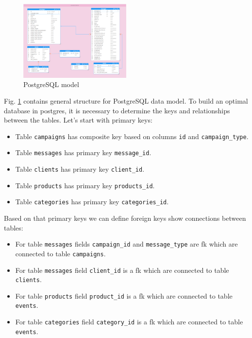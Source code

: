 \documentclass[conference]{IEEEtran}
\newcommand{\code}[1]{\colorbox{codegray}{\texttt{#1}}}
\begin{document}
\begin{figure}
  \centering
    \includegraphics[width=0.5\textwidth]{./pictures/postgres.png}
    \caption[PostgreSQL model]{PostgreSQL model}\label{fig:postgres}
\end{figure}

 Fig. \ref{fig:postgres} contains general structure for PostgreSQL data model. To build an optimal database in postgres, it is necessary to determine the keys and relationships between the tables. Let's start with primary keys:
 \begin{itemize}
     \item Table \code{campaigns} has composite key based on columns \code{id} and \code{campaign\_type}.
     \item Table \code{messages} has primary key \code{message\_id}.
     \item Table \code{clients} has primary key \code{client\_id}.
     \item Table \code{products} has primary key \code{products\_id}.
     \item Table \code{categories} has primary key \code{categories\_id}.
 \end{itemize}

Based on that primary keys we can define foreign keys show connections between tables:
\begin{itemize}
    \item For table \code{messages} fields \code{campaign\_id} and \code{message\_type} are fk which are connected to table \code{campaigns}.
    \item For table \code{messages} field \code{client\_id} is a fk which are connected to table \code{clients}.
    \item For table \code{products} field \code{product\_id} is a fk which are connected to table \code{events}.
    \item For table \code{categories} field \code{category\_id} is a fk which are connected to table \code{events}.
\end{itemize}
\end{document}

